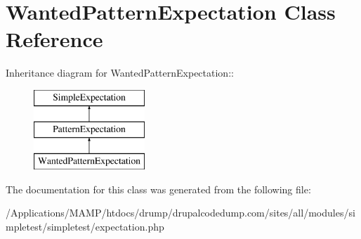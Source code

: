 \hypertarget{class_wanted_pattern_expectation}{
\section{WantedPatternExpectation Class Reference}
\label{class_wanted_pattern_expectation}
}
Inheritance diagram for WantedPatternExpectation::\begin{figure}[H]
\begin{center}
\leavevmode
\includegraphics[height=3cm]{class_wanted_pattern_expectation}
\end{center}
\end{figure}


The documentation for this class was generated from the following file:\begin{DoxyCompactItemize}
\item 
/Applications/MAMP/htdocs/drump/drupalcodedump.com/sites/all/modules/simpletest/simpletest/expectation.php\end{DoxyCompactItemize}
